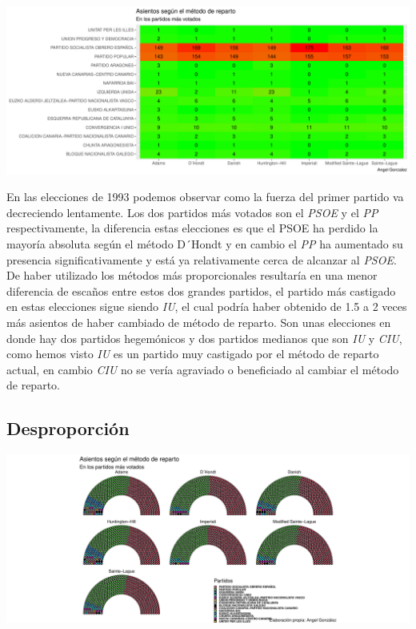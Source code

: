\documentclass[12pt,a4paper,]{book}
\numberwithin{dummy}{section}
\theoremstyle{ocrenumbox}
\theoremstyle{blacknumex}
\theoremstyle{blacknumbox}
\theoremstyle{ocrenum}
\theoremstyle{ocrenum}
\begin{document}
\begin{center}\includegraphics[width=1\linewidth]{figurasR/unnamed-chunk-91-2} \end{center}

En las elecciones de 1993 podemos observar como la fuerza del primer
partido va decreciendo lentamente. Los dos partidos más votados son el
\emph{PSOE} y el \emph{PP} respectivamente, la diferencia estas
elecciones es que el PSOE ha perdido la mayoría absoluta según el método
D´Hondt y en cambio el \emph{PP} ha aumentado su presencia
significativamente y está ya relativamente cerca de alcanzar al
\emph{PSOE}. De haber utilizado los métodos más proporcionales
resultaría en una menor diferencia de escaños entre estos dos grandes
partidos, el partido más castigado en estas elecciones sigue siendo
\emph{IU}, el cual podría haber obtenido de 1.5 a 2 veces más asientos
de haber cambiado de método de reparto. Son unas elecciones en donde hay
dos partidos hegemónicos y dos partidos medianos que son \emph{IU} y
\emph{CIU}, como hemos visto \emph{IU} es un partido muy castigado por
el método de reparto actual, en cambio \emph{CIU} no se vería agraviado
o beneficiado al cambiar el método de reparto.

\hypertarget{desproporciuxf3n-5}{%
\subsection{Desproporción}\label{desproporciuxf3n-5}}

\begin{center}\includegraphics[width=1\linewidth]{figurasR/unnamed-chunk-92-1} \end{center}
\end{document}
